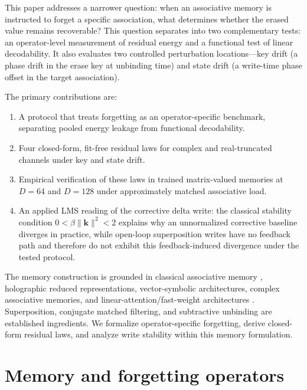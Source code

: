 \documentclass[11pt,a4paper]{article}
\begin{document}
This paper addresses a narrower question: when an associative memory is instructed to forget a specific association, what determines whether the erased value remains recoverable? This question separates into two complementary tests: an operator-level measurement of residual energy and a functional test of linear decodability. It also evaluates two controlled perturbation locations---key drift (a phase drift in the erase key at unbinding time) and state drift (a write-time phase offset in the target association).

The primary contributions are:
\begin{enumerate}
  \item A protocol that treats forgetting as an operator-specific benchmark, separating pooled energy leakage from functional decodability.
  \item Four closed-form, fit-free residual laws for complex and real-truncated channels under key and state drift.
  \item Empirical verification of these laws in trained matrix-valued memories at $D=64$ and $D=128$ under approximately matched associative load.
  \item An applied LMS reading of the corrective delta write: the classical stability condition $0 < \beta\|\mathbf{k}\|^2 < 2$ \citep{widrow1960adaptive,widrow1985adaptive} explains why an unnormalized corrective baseline diverges in practice, while open-loop superposition writes have no feedback path and therefore do not exhibit this feedback-induced divergence under the tested protocol.
\end{enumerate}

The memory construction is grounded in classical associative memory \citep{kohonen1972correlation,willshaw1969nonholographic,hopfield1982neural}, holographic reduced representations, vector-symbolic architectures, complex associative memories, and linear-attention/fast-weight architectures \citep{plate1995holographic,kanerva2009hyperdimensional,gayler2003vector,frady2018theory,frady2020resonator,noest1988phasor,katharopoulos2020transformers,schlag2021fastweight,yang2024deltanet}. Superposition, conjugate matched filtering, and subtractive unbinding are established ingredients. We formalize operator-specific forgetting, derive closed-form residual laws, and analyze write stability within this memory formulation.

\section{Memory and forgetting operators}\label{sec:operators}
\end{document}
